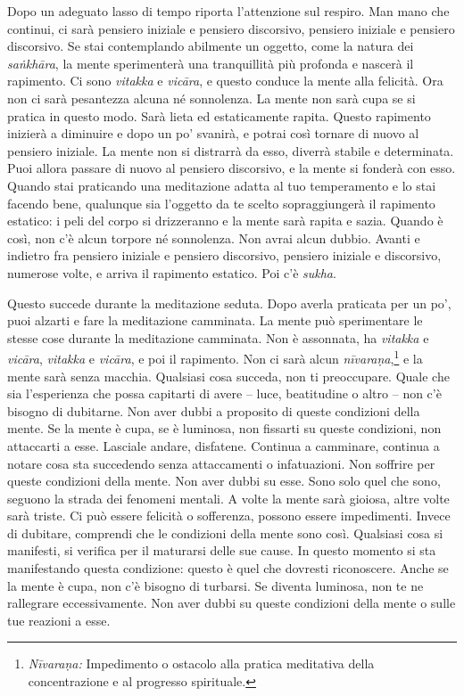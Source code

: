 Dopo un adeguato lasso di tempo riporta l'attenzione sul respiro. Man
mano che continui, ci sarà pensiero iniziale e pensiero discorsivo,
pensiero iniziale e pensiero discorsivo. Se stai contemplando abilmente
un oggetto, come la natura dei \emph{saṅkhāra}, la mente sperimenterà
una tranquillità più profonda e nascerà il rapimento. Ci sono
\emph{vitakka} e \emph{vicāra}, e questo conduce la mente alla felicità.
Ora non ci sarà pesantezza alcuna né sonnolenza. La mente non sarà cupa
se si pratica in questo modo. Sarà lieta ed estaticamente rapita. Questo
rapimento inizierà a diminuire e dopo un po' svanirà, e potrai così
tornare di nuovo al pensiero iniziale. La mente non si distrarrà da
esso, diverrà stabile e determinata. Puoi allora passare di nuovo al
pensiero discorsivo, e la mente si fonderà con esso. Quando stai
praticando una meditazione adatta al tuo temperamento e lo stai facendo
bene, qualunque sia l'oggetto da te scelto sopraggiungerà il rapimento
estatico: i peli del corpo si drizzeranno e la mente sarà rapita e
sazia. Quando è così, non c'è alcun torpore né sonnolenza. Non avrai
alcun dubbio. Avanti e indietro fra pensiero iniziale e pensiero
discorsivo, pensiero iniziale e discorsivo, numerose volte, e arriva il
rapimento estatico. Poi c'è \emph{sukha}.

Questo succede durante la meditazione seduta. Dopo averla praticata per
un po', puoi alzarti e fare la meditazione camminata. La mente può
sperimentare le stesse cose durante la meditazione camminata. Non è
assonnata, ha \emph{vitakka} e \emph{vicāra}, \emph{vitakka} e
\emph{vicāra}, e poi il rapimento. Non ci sarà alcun
\emph{nīvaraṇa},\footnote{\emph{Nīvaraṇa:} Impedimento o ostacolo alla
  pratica meditativa della concentrazione e al progresso spirituale.} e
la mente sarà senza macchia. Qualsiasi cosa succeda, non ti preoccupare.
Quale che sia l'esperienza che possa capitarti di avere -- luce,
beatitudine o altro -- non c'è bisogno di dubitarne. Non aver dubbi a
proposito di queste condizioni della mente. Se la mente è cupa, se è
luminosa, non fissarti su queste condizioni, non attaccarti a esse.
Lasciale andare, disfatene. Continua a camminare, continua a notare cosa
sta succedendo senza attaccamenti o infatuazioni. Non soffrire per
queste condizioni della mente. Non aver dubbi su esse. Sono solo quel
che sono, seguono la strada dei fenomeni mentali. A volte la mente sarà
gioiosa, altre volte sarà triste. Ci può essere felicità o sofferenza,
possono essere impedimenti. Invece di dubitare, comprendi che le
condizioni della mente sono così. Qualsiasi cosa si manifesti, si
verifica per il maturarsi delle sue cause. In questo momento si sta
manifestando questa condizione: questo è quel che dovresti riconoscere.
Anche se la mente è cupa, non c'è bisogno di turbarsi. Se diventa
luminosa, non te ne rallegrare eccessivamente. Non aver dubbi su queste
condizioni della mente o sulle tue reazioni a esse.

